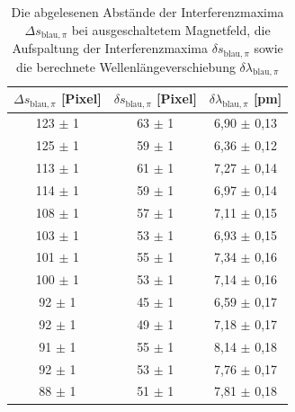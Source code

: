             \FloatBarrier

              \begin{table}[h]
                \centering
                \caption{Die abgelesenen Abstände der Interferenzmaxima $\Delta s_{\text{blau}, \pi}$ bei ausgeschaltetem Magnetfeld, die Aufspaltung der Interferenzmaxima $\delta s_{\text{blau}, \pi}$ sowie die berechnete Wellenlängeverschiebung $\delta \lambda_{\text{blau}, \pi}$}
                \label{tab:blau_pi} 
              
                \begin{tabular}{c c c}
                  \toprule
                  {$\Delta s_{\text{blau}, \pi}$ [Pixel]} & {$\delta s_{\text{blau}, \pi}$ [Pixel]} & {$\delta \lambda_{\text{blau}, \pi}$ [\si{\pico\metre}]} \\ 
                  \midrule
                   123 $\pm$ 1  &   63 $\pm$ 1   &   6,90 $\pm$ 0,13   \\
                   125 $\pm$ 1  &   59 $\pm$ 1   &   6,36 $\pm$ 0,12   \\
                   113 $\pm$ 1  &   61 $\pm$ 1   &   7,27 $\pm$ 0,14   \\
                   114 $\pm$ 1  &   59 $\pm$ 1   &   6,97 $\pm$ 0,14   \\
                   108 $\pm$ 1  &   57 $\pm$ 1   &   7,11 $\pm$ 0,15   \\
                   103 $\pm$ 1  &   53 $\pm$ 1   &   6,93 $\pm$ 0,15   \\
                   101 $\pm$ 1  &   55 $\pm$ 1   &   7,34 $\pm$ 0,16   \\
                   100 $\pm$ 1  &   53 $\pm$ 1   &   7,14 $\pm$ 0,16   \\
                   92  $\pm$ 1  &   45 $\pm$ 1   &   6,59 $\pm$ 0,17   \\
                   92  $\pm$ 1  &   49 $\pm$ 1   &   7,18 $\pm$ 0,17   \\
                   91  $\pm$ 1  &   55 $\pm$ 1   &   8,14 $\pm$ 0,18   \\
                   92  $\pm$ 1  &   53 $\pm$ 1   &   7,76 $\pm$ 0,17   \\
                   88  $\pm$ 1  &   51 $\pm$ 1   &   7,81 $\pm$ 0,18   \\

                  \bottomrule
                \end{tabular}
              \end{table}
              \FloatBarrier


